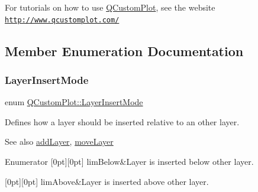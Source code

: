 For tutorials on how to use \mbox{\hyperlink{class_q_custom_plot}{Q\+Custom\+Plot}}, see the website~\newline
\href{http://www.qcustomplot.com/}{\tt http\+://www.\+qcustomplot.\+com/} 

\subsection{Member Enumeration Documentation}
\mbox{\label{class_q_custom_plot_a75a8afbe6ef333b1f3d47abb25b9add7}} 
\subsubsection{\texorpdfstring{Layer\+Insert\+Mode}{LayerInsertMode}}
{\footnotesize\ttfamily enum \mbox{\hyperlink{class_q_custom_plot_a75a8afbe6ef333b1f3d47abb25b9add7}{Q\+Custom\+Plot\+::\+Layer\+Insert\+Mode}}}

Defines how a layer should be inserted relative to an other layer.

\begin{DoxySeeAlso}{See also}
\mbox{\hyperlink{class_q_custom_plot_ad5255393df078448bb6ac83fa5db5f52}{add\+Layer}}, \mbox{\hyperlink{class_q_custom_plot_ae896140beff19424e9e9e02d6e331104}{move\+Layer}} 
\end{DoxySeeAlso}
\begin{DoxyEnumFields}{Enumerator}
[0pt][0pt]{}\mbox{\label{class_q_custom_plot_a75a8afbe6ef333b1f3d47abb25b9add7aee39cf650cd24e68552da0b697ce4a93}} 
lim\+Below&Layer is inserted below other layer. \\
\hline

[0pt][0pt]{}\mbox{\label{class_q_custom_plot_a75a8afbe6ef333b1f3d47abb25b9add7a062b0b7825650b432a713c0df6742d41}} 
lim\+Above&Layer is inserted above other layer. \\
\hline

\end{DoxyEnumFields}
\mbox{\label{class_q_custom_plot_a45d61392d13042e712a956d27762aa39}} 
